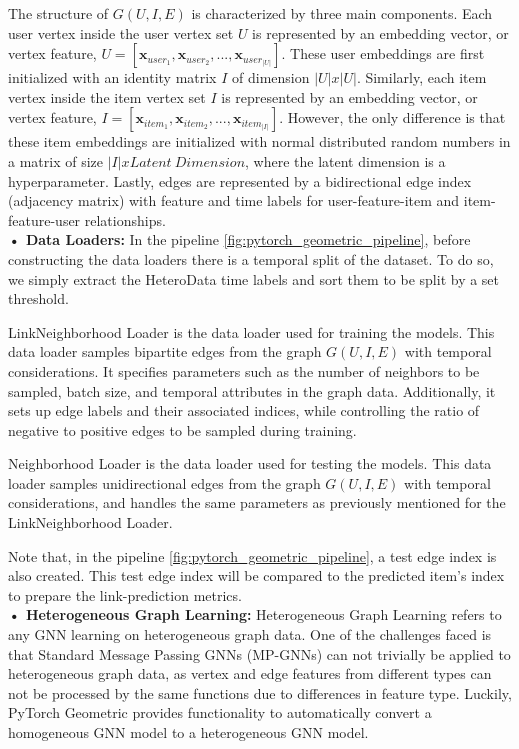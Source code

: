\documentclass[bst/sn-nature]{sn-jnl}
\begin{document}
\begin{multicols}{2}
The structure of $G(U,I,E)$ is characterized by three main components. Each user vertex inside the user vertex set $U$ is represented by an embedding vector, or vertex feature, $U=[\mathbf{x}_{user_{1}},\mathbf{x}_{user_{2}}, ..., \mathbf{x}_{user_{|U|}}]$. These user embeddings are first initialized with an identity matrix $I$ of dimension $|U|x|U|$. Similarly, each item vertex inside the item vertex set $I$ is represented by an embedding vector, or vertex feature, $I=[\mathbf{x}_{item_{1}},\mathbf{x}_{item_{2}}, ..., \mathbf{x}_{item_{|I|}}]$. However, the only difference is that these item embeddings are initialized with normal distributed random numbers in a matrix of size $|I|xLatent \ Dimension$, where the latent dimension is a hyperparameter. Lastly, edges are represented by a bidirectional edge index (adjacency matrix) with feature and time labels for user-feature-item and item-feature-user relationships. \\

\textbf{• Data Loaders:} In the pipeline \ref{fig:pytorch_geometric_pipeline}, before constructing the data loaders there is a temporal split of the dataset. To do so, we simply extract the HeteroData time labels and sort them to be split by a set threshold.

LinkNeighborhood Loader is the data loader used for training the models. This data loader samples bipartite edges from the graph $G(U,I,E)$ with temporal considerations. It specifies parameters such as the number of neighbors to be sampled, batch size, and temporal attributes in the graph data. Additionally, it sets up edge labels and their associated indices, while controlling the ratio of negative to positive edges to be sampled during training. 

Neighborhood Loader\cite{sageconv} is the data loader used for testing the models. This data loader samples unidirectional edges from the graph $G(U,I,E)$ with temporal considerations, and handles the same parameters as previously mentioned for the LinkNeighborhood Loader.

Note that, in the pipeline \ref{fig:pytorch_geometric_pipeline}, a test edge index is also created. This test edge index will be compared to the predicted item’s index to prepare the link-prediction metrics. \\ 

\textbf{• Heterogeneous Graph Learning:} Heterogeneous Graph Learning refers to any GNN learning on heterogeneous graph data. One of the challenges faced is that Standard Message Passing GNNs (MP-GNNs) can not trivially be applied to heterogeneous graph data, as vertex and edge features from different types can not be processed by the same functions due to differences in feature type. Luckily, PyTorch Geometric provides functionality to automatically convert a homogeneous GNN model to a heterogeneous GNN model. 


\end{multicols}
\end{document}
